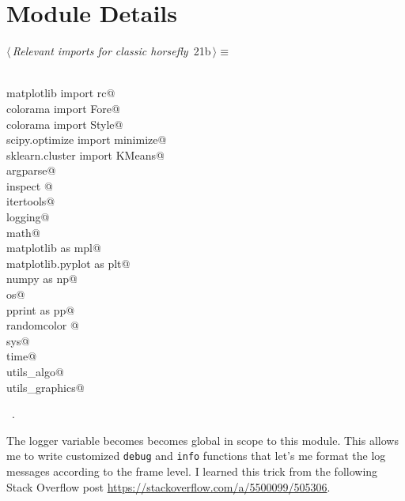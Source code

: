 \documentclass[11.5pt]{report}
\begin{document}
\section{Module Details}

\newchunk 
\begin{flushleft} \small\label{scrap14}\raggedright\small
{} $\langle\,${\itshape Relevant imports for classic horsefly}\nobreak\ {\footnotesize {21b}}$\,\rangle\equiv$
\vspace{-1ex}
\begin{list}{}{} \item
\mbox{}\verb@@\\
\mbox{}\verb@from matplotlib import rc@\\
\mbox{}\verb@from colorama import Fore@\\
\mbox{}\verb@from colorama import Style@\\
\mbox{}\verb@from scipy.optimize import minimize@\\
\mbox{}\verb@from sklearn.cluster import KMeans@\\
\mbox{}\verb@import argparse@\\
\mbox{}\verb@import inspect @\\
\mbox{}\verb@import itertools@\\
\mbox{}\verb@import logging@\\
\mbox{}\verb@import math@\\
\mbox{}\verb@import matplotlib as mpl@\\
\mbox{}\verb@import matplotlib.pyplot as plt@\\
\mbox{}\verb@import numpy as np@\\
\mbox{}\verb@import os@\\
\mbox{}\verb@import pprint as pp@\\
\mbox{}\verb@import randomcolor @\\
\mbox{}\verb@import sys@\\
\mbox{}\verb@import time@\\
\mbox{}\verb@import utils_algo@\\
\mbox{}\verb@import utils_graphics@\\
\mbox{}\verb@@{\NWsep}
\end{list}
\vspace{-1.5ex}
\footnotesize
\begin{list}{}{\setlength{\itemsep}{-\parsep}\setlength{\itemindent}{-\leftmargin}}
\item \NWtxtMacroRefIn\ .

\item{}
\end{list}
\vspace{4ex}
\end{flushleft}
\vspace{-0.8cm}\newchunk The logger variable becomes becomes global in scope to this module. This allows
me to write customized \texttt{debug} and \texttt{info} functions that let's me format 
the log messages according to the frame level. I learned this trick from the following 
Stack Overflow post \url{https://stackoverflow.com/a/5500099/505306}. 
\end{document}
